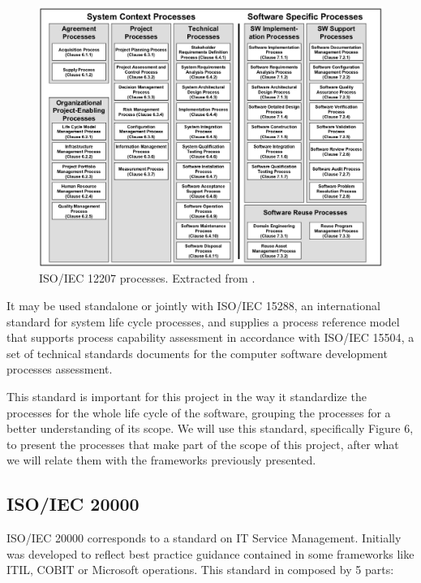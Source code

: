 \begin{figure}[h!]
\centering
\includegraphics[width=\textwidth]{img/ISO12207Processes.png}
\caption{ISO/IEC 12207 processes. Extracted from \cite{ISO12207}.}
\end{figure}

It may be used standalone or jointly with ISO/IEC 15288\cite{ISO15288}, an international standard for system life cycle processes, and supplies a process reference model that supports process capability assessment in accordance with ISO/IEC 15504\cite{ISO15504}, a set of technical standards documents for the computer software development processes assessment.\par
This standard is important for this project in the way it standardize the processes for the whole life cycle of the software, grouping the processes for a better understanding of its scope. We will use this standard, specifically Figure 6, to present the processes that make part of the scope of this project, after what we will relate them with the frameworks previously presented. 


\subsection{ISO/IEC 20000}

ISO/IEC 20000 corresponds to a standard on IT Service Management. Initially was developed to reflect best practice guidance contained in some frameworks like ITIL, COBIT or Microsoft operations. This standard in composed by 5 parts:

